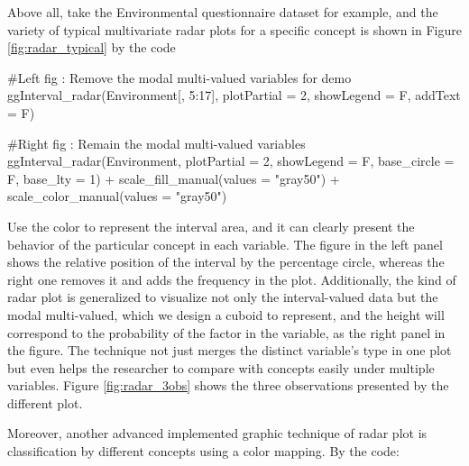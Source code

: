 \documentclass[article]{jss}
\begin{document}
Above all, take the Environmental questionnaire dataset for example, and the variety of typical multivariate radar plots for a specific concept is shown in Figure \ref{fig:radar_typical} by the code

\begin{CodeChunk}
\begin{CodeInput}
#Left fig : Remove the modal multi-valued variables for demo
ggInterval_radar(Environment[, 5:17], plotPartial = 2, showLegend = F, 
                 addText = F) 

#Right fig : Remain the modal multi-valued variables
ggInterval_radar(Environment, plotPartial = 2, showLegend = F,
                 base_circle = F, base_lty = 1) +
  scale_fill_manual(values = "gray50") +
  scale_color_manual(values = "gray50") 

\end{CodeInput}
\end{CodeChunk}

Use the color to represent the interval area, and it can clearly present the behavior of the particular concept in each variable. The figure in the left panel shows the relative position of the interval by the percentage circle, whereas the right one removes it and adds the frequency in the plot. Additionally, the kind of radar plot is generalized to visualize not only the interval-valued data but the modal multi-valued, which we design a cuboid to represent, and the height will correspond to the probability of the factor in the variable, as the right panel in the figure. The technique not just merges the distinct variable's type in one plot but even helps the researcher to compare with concepts easily under multiple variables. Figure \ref{fig:radar_3obs} shows the three observations presented by the different plot. 

Moreover, another advanced implemented graphic technique of radar plot is classification by different concepts using a color mapping. By the code:
\end{document}
